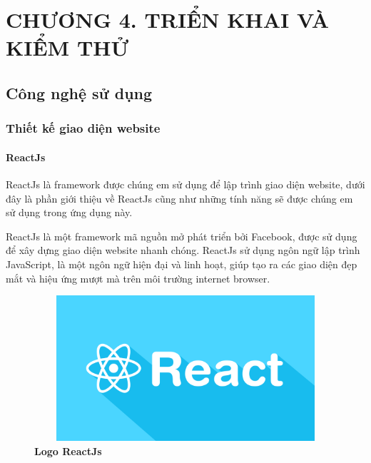 
\section*{CHƯƠNG 4. TRIỂN KHAI VÀ KIỂM THỬ}
\setcounter{section}{4}
\setcounter{subsection}{0} %
\setcounter{table}{0} %
\setcounter{figure}{0} %

\subsection{Công nghệ sử dụng}

\subsubsection{Thiết kế giao diện website}

\paragraph{ReactJs}
\mbox{}

ReactJs là framework được chúng em sử dụng để lập trình giao diện website, dưới đây là phần giới thiệu về ReactJs cũng
như những tính năng sẽ được chúng em sử dụng trong ứng dụng này.

ReactJs là một framework mã nguồn mở phát triển bởi Facebook, được sử dụng để xây dựng giao diện website nhanh chóng. 
ReactJs sử dụng ngôn ngữ lập trình JavaScript, là một ngôn ngữ hiện đại và linh hoạt, giúp tạo ra các giao diện đẹp mắt và hiệu ứng mượt mà trên môi trường internet browser.
\begin{figure}[H]
  \centering
  \includegraphics[width=12cm,height=5.4cm]{Images/reactjs_cover.png}
  \caption[Logo ReactJs]{\bfseries \fontsize{12pt}{0pt}
  \selectfont Logo ReactJs}
  \label{reactjs_cover} %
\end{figure}

